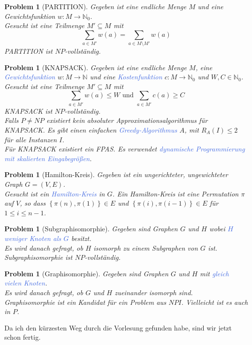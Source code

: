 \documentclass[11pt]{article}
\newcommand{\tcol}[1]{\textcolor{RoyalBlue}{#1}}
\newcommand{\set}[1]{\left\lbrace #1\right\rbrace}
\theoremstyle{break}
\newtheorem{prob}[satz]{Problem}
\begin{document}
\begin{prob}[PARTITION]
Gegeben ist eine endliche Menge $M$ und eine Gewichtsfunktion $w\colon M\to\mathbb{N}
_0$.\\
Gesucht ist eine Teilmenge $M'\subseteq M$ mit
\[\sum_{a\in M'}w(a)=\sum_{a\in M\setminus M'}w(a)\]
PARTITION ist $NP$-vollständig.
\end{prob}

\begin{prob}[KNAPSACK]
Gegeben ist eine endliche Menge $M$, eine \tcol{Gewichtsfunktion} $w\colon M\to\mathbb{N}$ und eine \tcol{Kostenfunktion} $c\colon M\to\mathbb{N}
_0$ und $W,C\in\mathbb{N}_0$.\\
Gesucht ist eine Teilmenge $M'\subseteq M$ mit
\[\sum_{a\in M'}w(a)\leq W\text{ und }\sum_{a\in M'}c(a)\geq C\]
KNAPSACK ist $NP$-vollständig.\\
Falls $P\neq NP$ existiert kein absoluter Approximationsalgorithmus für KNAPSACK. Es gibt einen einfachen \tcol{Greedy-Algorithmus} $A$, mit $R_A(I)\leq 2$ für alle Instanzen $I$.\\
Für KNAPSACK existiert ein FPAS. Es verwendet \tcol{dynamische Programmierung mit skalierten Eingabegrößen}.
\end{prob}

\begin{prob}[Hamilton-Kreis]
Gegeben ist ein ungerichteter, ungewichteter Graph $G=(V,E)$.\\
Gesucht ist ein \tcol{Hamilton-Kreis} in $G$. Ein Hamilton-Kreis ist eine Permutation $\pi$ auf $V$, so dass $\set{\pi(n),\pi(1)}\in E$ und $\set{\pi(i),\pi(i-1)}\in E$ für $1\leq i\leq n-1$.
\end{prob}

\begin{prob}[Subgraphisomorphie]
Gegeben sind Graphen $G$ und $H$ wobei \tcol{$H$ weniger Knoten als $G$} besitzt.\\
Es wird danach gefragt, ob $H$ isomorph zu einem Subgraphen von $G$ ist.\\
Subgraphisomorphie ist $NP$-vollständig.
\end{prob}

\begin{prob}[Graphisomorphie]
Gegeben sind Graphen $G$ und $H$ mit \tcol{gleich vielen Knoten}.\\
Es wird danach gefragt, ob $G$ und $H$ zueinander isomorph sind.\\
Graphisomorphie ist ein Kandidat für ein Problem aus $NPI$. Vielleicht ist es auch in $P$.
\end{prob}

\newpage
\glqq Da ich den kürzesten Weg durch die Vorlesung gefunden habe, sind wir jetzt schon fertig.\grqq{}

\printindex
\end{document}
